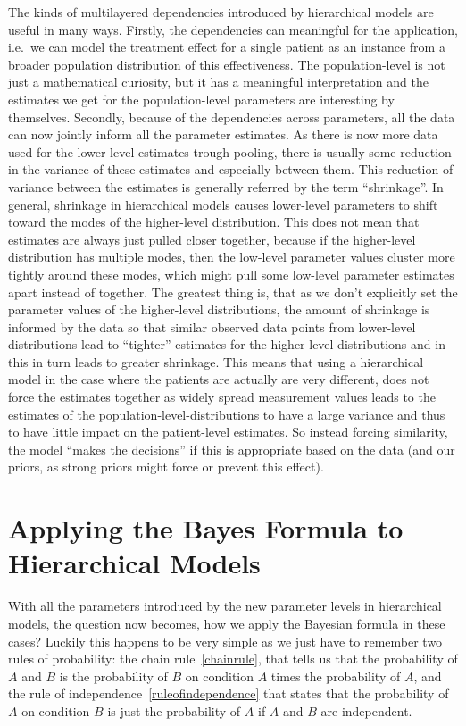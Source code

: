 \documentclass[12pt,a4paper,leqno]{report}
\theoremstyle{plain}
\theoremstyle{definition}
\theoremstyle{remark}
\begin{document}
The kinds of multilayered dependencies introduced by hierarchical models are useful in many ways.
Firstly, the dependencies can meaningful for the application, i.e.\ we can
model the treatment effect for a single patient as an instance from a
broader population distribution of this effectiveness. The population-level is not just
a mathematical curiosity, but it has a meaningful interpretation and the estimates we
get for the population-level parameters are interesting by themselves. Secondly, because
of the dependencies across parameters, all the data can now jointly inform all the
parameter estimates. As there is now more data used for the lower-level estimates trough
pooling, there is usually some reduction in the variance of these estimates
and especially between them. This reduction of variance between the estimates is
generally referred by the term ``shrinkage''. In general,
shrinkage in hierarchical models causes lower-level parameters to shift toward the modes
of the higher-level distribution. This does not mean that
estimates are always just pulled closer together, because if the higher-level
distribution has multiple modes, then the low-level parameter values cluster
more tightly around these modes, which might pull some
low-level parameter estimates apart instead of together. The greatest thing
is, that as we don't explicitly set the parameter values of the higher-level
distributions, the amount of shrinkage is informed by the data so that
similar observed data points from lower-level distributions lead to ``tighter''
estimates for the higher-level distributions and in this in turn leads to
greater shrinkage. This means that using a hierarchical model in the case where the
patients are actually are very different, does not force the estimates together as
widely spread measurement values leads to the estimates of the population-level-distributions to
have a large variance and thus to have little impact on the patient-level estimates. So
instead forcing similarity, the model ``makes the decisions'' if this is appropriate
based on the data (and our priors, as strong priors might force or prevent this effect).

\section{Applying the Bayes Formula to Hierarchical Models}

With all the parameters introduced by the new parameter levels in hierarchical models,
the question now becomes, how we apply
the Bayesian formula in these cases? Luckily this happens to be very simple as we just
have to remember two rules of probability: the chain rule\ \ref{chainrule}, that
tells us that the probability of \(A\) and \(B\) is the probability of \(B\) on condition \(A\)
times the probability of \(A\), and the rule of independence\ \ref{ruleofindependence}
that states that the
probability of \(A\) on condition \(B\) is just the probability of \(A\) if \(A\) and
\(B\) are independent.
\end{document}
